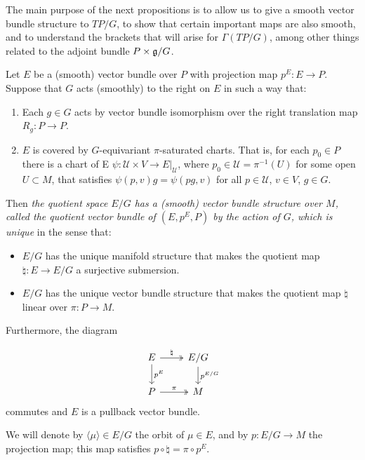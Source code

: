 

The main purpose of the next propositions is to allow us to give a smooth vector bundle structure to $TP/G$, to show that certain important maps are also smooth, and to understand the brackets that will arise for $\Gamma(TP/G)$, among other things related to the adjoint bundle $P\times \mathfrak{g}/G$.

\begin{proposition} \label{3.1.1}
Let $E$ be a (smooth) vector bundle over $P$ with projection map $p^E: E \to P$. Suppose that $G$ acts (smoothly) to the right on $E$ in such a way that:

\begin{enumerate}
    \item Each $g \in G$ acts by vector bundle isomorphism over the right translation map $R_g: P \to P$.
    
    \item $E$ is covered by $G$-equivariant $\pi$-saturated charts. That is, for each $p_0 \in P$ there is a chart of E $\psi: \mathcal U \times V \to E|_{\mathcal U}$, where $p_0 \in \mathcal U = \pi^{-1}(U)$ for some open $U \subset M$, that satisfies $\psi(p, v)g = \psi(pg, v)$ for all $p \in \mathcal U$, $v \in V$, $g \in G$.
\end{enumerate}

Then \emph{the quotient space $E/G$ has a (smooth) vector bundle structure over $M$, called \emph{the quotient vector bundle of $(E, p^E, P)$ by the action of $G$}, which is unique} in the sense that:

\begin{itemize}
    \item $E/G$ has the unique manifold structure that makes the quotient map $\natural: E \to E/G$ a surjective submersion.
    \item $E/G$ has the unique vector bundle structure that makes the quotient map $\natural$ linear over $\pi: P \to M$.
\end{itemize}

Furthermore, the diagram

\begin{equation} \label{pullbackQuotient}
\begin{tikzcd}
    E \arrow[two heads]{r}{\natural} \arrow{d}{p^E} & E/G \arrow{d}{p^{E/G}} \\
    P \arrow[two heads]{r}{\pi}                     & M
\end{tikzcd}
\end{equation}
commutes and $E$ is a pullback vector bundle.

We will denote by $\langle \mu \rangle \in E/G$ the orbit of $\mu \in E$, and by $p:E/G \to M$ the projection map; this map satisfies $p \circ \natural = \pi \circ p^E$.

\end{proposition}

